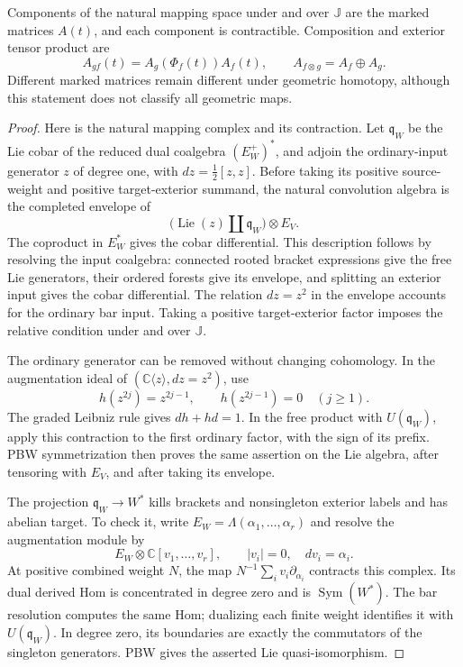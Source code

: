 \begin{lemma}\label{cycen:lem:marked}
Components of the natural mapping space under and over
$\mathbb J$ are the marked matrices $A(t)$, and each
component is contractible. Composition and exterior tensor
product are
\begin{equation}\label{cycen:eq:marked-law}
 A_{g f}(t)=A_g(\Phi_f(t))A_f(t),
 \qquad A_{f\otimes g}=A_f\oplus A_g.
\end{equation}
Different marked matrices remain different under geometric
homotopy, although this statement does not classify all
geometric maps.
\end{lemma}
\begin{proof}
Here is the natural mapping complex and its contraction.
Let $\mathfrak q_W$ be the Lie cobar of the reduced dual
coalgebra $(E_W^+)^*$, and adjoin the ordinary-input
generator $z$ of degree one, with $dz=\tfrac12[z,z]$.
Before taking its positive source-weight and
positive target-exterior summand, the
natural convolution algebra is the completed envelope of
\[
 \bigl(\operatorname{Lie}(z)\amalg\mathfrak q_W\bigr)
                         \otimes E_V.
\]
The coproduct in $E_W^*$ gives the cobar differential.
This description follows by resolving the input coalgebra:
connected rooted bracket expressions give the free Lie
generators, their ordered forests give its envelope, and
splitting an exterior input gives the cobar differential.
The relation $dz=z^2$ in the envelope accounts for the
ordinary bar input. Taking a positive target-exterior
factor imposes the relative condition under and over
$\mathbb J$.

The ordinary generator can be removed without changing
cohomology. In the augmentation ideal of
$(\mathbb C\langle z\rangle,dz=z^2)$, use
\[
 h(z^{2j})=z^{2j-1},\qquad h(z^{2j-1})=0
 \quad(j\geq1).
\]
The graded Leibniz rule gives $dh+hd=1$. In the free
product with $U(\mathfrak q_W)$, apply this contraction
to the first ordinary factor, with the sign of its prefix.
PBW symmetrization then proves the same assertion on
the Lie algebra, after tensoring with $E_V$, and after
taking its envelope.

The projection $\mathfrak q_W\to W^*$ kills brackets and
nonsingleton exterior labels and has abelian target.
To check it, write
$E_W=\Lambda(\alpha_1,\ldots,\alpha_r)$ and resolve the
augmentation module by
\[
 E_W\otimes\mathbb C[v_1,\ldots,v_r],
 \qquad |v_i|=0,\quad dv_i=\alpha_i.
\]
At positive combined weight $N$, the map
$N^{-1}\sum_i v_i\partial_{\alpha_i}$ contracts this
complex. Its dual derived Hom is concentrated in degree
zero and is $\operatorname{Sym}(W^*)$. The bar resolution
computes the same Hom; dualizing each finite weight
identifies it with $U(\mathfrak q_W)$. In degree zero,
its boundaries are exactly the commutators of the
singleton generators. PBW gives the asserted Lie
quasi-isomorphism.


\end{proof}
